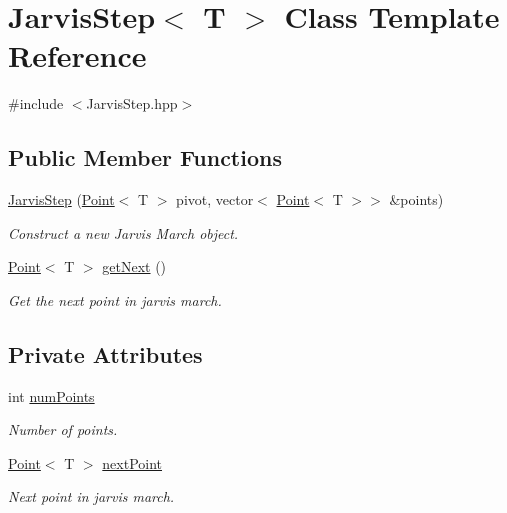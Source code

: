 \hypertarget{classJarvisStep}{}\section{Jarvis\+Step$<$ T $>$ Class Template Reference}
\label{classJarvisStep}


{\ttfamily \#include $<$Jarvis\+Step.\+hpp$>$}

\subsection*{Public Member Functions}
\begin{DoxyCompactItemize}
\item 
\mbox{\hyperlink{classJarvisStep_a92ed989e83f65b0ddeb17b2f4b278f2a}{Jarvis\+Step}} (\mbox{\hyperlink{classPoint}{Point}}$<$ T $>$ pivot, vector$<$ \mbox{\hyperlink{classPoint}{Point}}$<$ T $>$$>$ \&points)
\begin{DoxyCompactList}\small\item\em Construct a new Jarvis March object. \end{DoxyCompactList}\item 
\mbox{\hyperlink{classPoint}{Point}}$<$ T $>$ \mbox{\hyperlink{classJarvisStep_a66f21d257e022fdeb8dc028bd2ac716c}{get\+Next}} ()
\begin{DoxyCompactList}\small\item\em Get the next point in jarvis march. \end{DoxyCompactList}\end{DoxyCompactItemize}
\subsection*{Private Attributes}
\begin{DoxyCompactItemize}
\item 
int \mbox{\hyperlink{classJarvisStep_acda18cb9b72668a839239761aeedd7fa}{num\+Points}}
\begin{DoxyCompactList}\small\item\em Number of points. \end{DoxyCompactList}\item 
\mbox{\hyperlink{classPoint}{Point}}$<$ T $>$ \mbox{\hyperlink{classJarvisStep_a35b1bc8bd742976a76dd47a5850f67fa}{next\+Point}}
\begin{DoxyCompactList}\small\item\em Next point in jarvis march. \end{DoxyCompactList}\end{DoxyCompactItemize}


